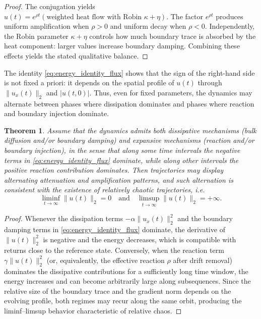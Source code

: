 \documentclass[12pt]{article}
\newtheorem{theorem}{Theorem}[section]
\begin{document}
\begin{proof}
The conjugation yields $u(t)=e^{\rho t}(\text{weighted heat flow with Robin }\kappa+\eta)$. The factor $e^{\rho t}$ produces uniform amplification when $\rho>0$ and uniform decay when $\rho<0$. Independently, the Robin parameter $\kappa+\eta$ controls how much boundary trace is absorbed by the heat component: larger values increase boundary damping. Combining these effects yields the stated qualitative balance.
\end{proof}


The identity \eqref{eq:energy_identity_flux} shows that the sign of the right-hand side is not fixed a priori: it depends on the spatial profile of $u(t)$ through $\|u_x(t)\|_2$ and $|u(t,0)|$. Thus, even for fixed parameters, the dynamics may alternate between phases where dissipation dominates and phases where reaction and boundary injection dominate.

\begin{theorem}\label{thm:energy_relative_chaos}
Assume that the dynamics admits both dissipative mechanisms (bulk diffusion and/or boundary damping) and expansive mechanisms (reaction and/or boundary injection), in the sense that along some time intervals the negative terms in \eqref{eq:energy_identity_flux} dominate, while along other intervals the positive reaction contribution dominates. Then trajectories may display alternating
attenuation and amplification patterns, and such alternation is consistent with the existence of relatively chaotic trajectories, i.e.
\[
\liminf_{t\to\infty}\|u(t)\|_{2}=0
\quad\text{and}\quad
\limsup_{t\to\infty}\|u(t)\|_{2}=+\infty .
\]
\end{theorem}

\begin{proof}
Whenever the dissipation terms $-\alpha\|u_x(t)\|_2^2$ and the boundary damping terms in \eqref{eq:energy_identity_flux} dominate, the derivative of $\|u(t)\|_2^2$ is negative and the energy decreases, which is compatible with returns close to the reference state. Conversely, when the reaction term $\gamma\|u(t)\|_2^2$ (or, equivalently, the effective reaction $\rho$ after drift removal) dominates the dissipative contributions for a sufficiently long time
window, the energy increases and can become arbitrarily large along subsequences. Since the relative size of the boundary trace and the gradient norm depends on the evolving profile, both regimes may recur along the same orbit, producing the liminf--limsup behavior characteristic of relative chaos.
\end{proof}
\end{document}
